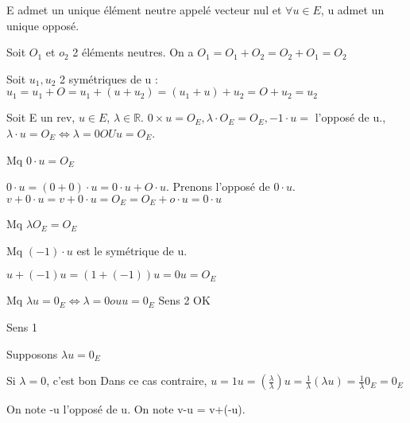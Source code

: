 \documentclass[french]{yLectureNote}
\newcommand{\R}[0]{\mathbb{R}}
\begin{document}
\begin{proposition}
E admet un unique élément neutre appelé vecteur nul et \(\forall u\in E\), u admet un unique opposé.
\end{proposition}
\begin{myproof}
Soit $O_1$ et $o_2$ 2 éléments neutres. On a \(O_1 = O_1+O_2=O_2+O_1=O_2\)

Soit $u_1,u_2$ 2 symétriques de u : \(u_1=u_1+O=u_1+(u+u_2) = (u_1+u)+u_2 = O+u_2 = u_2\)
\end{myproof}
\begin{proposition}
Soit E un rev, \(u\in E\), \(\lambda \in \R\). \(0\times u = O_E, \lambda \cdot O_E = O_E, -1\cdot u =\) l'opposé de u., \(\lambda\cdot u = O_E \iff \lambda = 0 OU u=O_E\).
\end{proposition}
\begin{myproof}
Mq \(0\cdot u = O_E\)

\(0\cdot u = (0+0)\cdot u = 0\cdot u + O\cdot u\). Prenons l'opposé de \(0\cdot u\). \(v+0\cdot u = v+0\cdot u = O_E = O_E+o\cdot u = 0\cdot u\)

Mq \(\lambda O_E= O_E\)

Mq \((-1)\cdot u\) est le symétrique de u.

\(u+(-1)u = (1+(-1))u = 0u = O_E\)

Mq \(\lambda u =0_E \iff \lambda = 0 ou u=0_E\)
Sens 2 OK

Sens 1

Supposons \(\lambda u = 0_E\)

Si \(\lambda = 0\), c'est bon
Dans ce cas contraire, \(u = 1 u = (\frac{\lambda}{\lambda}) u= \frac{1}{\lambda} (\lambda u) = \frac{1}{\lambda} 0_E = 0_E\)
\end{myproof}
On note -u l'opposé de u. On note v-u = v+(-u).
\end{document}
